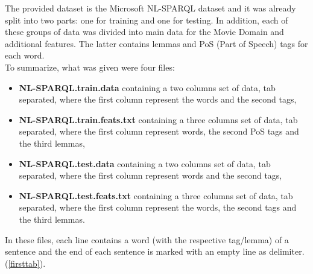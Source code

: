 \documentclass[11pt,a4paper]{article}
\begin{document}
The provided dataset is the Microsoft NL-SPARQL dataset and it was already split into two parts: one for training and one for testing. In addition, each of these groups of data was divided into main data for the Movie Domain and additional features. The latter contains lemmas and PoS (Part of Speech) tags for each word.\\ 
To summarize, what was given were four files:
\begin{itemize}
	\item \textbf{NL-SPARQL.train.data} containing a two columns set of data, tab separated, where the first column represent the words and the second tags,
	\item \textbf{NL-SPARQL.train.feats.txt} containing a three columns set of data, tab separated, where the first column represent words, the second PoS tags and the third lemmas,
	\item \textbf{NL-SPARQL.test.data} containing a two columns set of data, tab separated, where the first column represent words and the second tags,
	\item \textbf{NL-SPARQL.test.feats.txt} containing a three columns set of data, tab separated, where the first column represent the words, the second tags and the third lemmas.
\end{itemize}

In these files, each line contains a word (with the respective tag/lemma) of a sentence and the end of each sentence is marked with an empty line as delimiter. (\ref{firsttab}).\\
\end{document}
